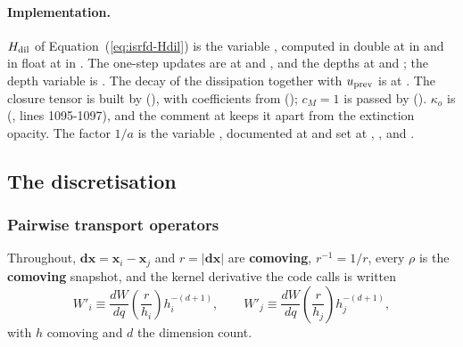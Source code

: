 \paragraph{Implementation.} $H_{\rm dil}$ of Equation~(\ref{eq:isrfd-Hdil}) is
the variable , computed in double at 
in  and in float at
 in . The
one-step updates are at  and ,
and the depths at  and ; the depth
variable is . The decay of the dissipation together with $u_{\rm prev}$
is at . The closure tensor is built by
(), with coefficients from
(); $c_M = 1$ is passed by
(). $\kappa_o$ is
(, lines 1095-1097), and the comment at
 keeps it apart from the extinction opacity. The
factor $1/a$ is the variable , documented
at  and set at ,
,  and .

\subsection{The discretisation}
\label{sec:isrf-eqdisc-disc}

\subsubsection{Pairwise transport operators}
\label{sec:isrf-eqdisc-pairwise}

Throughout, $\boldsymbol{dx} = \boldsymbol{x}_i - \boldsymbol{x}_j$ and
$r = |\boldsymbol{dx}|$ are \textbf{comoving}, $r^{-1} = 1/r$, every $\rho$ is the
\textbf{comoving}  snapshot, and the kernel derivative the code
calls  is written
\begin{equation}
  W'_i \equiv \frac{dW}{dq}\!\left(\frac{r}{h_i}\right) h_i^{-(d+1)},
  \qquad
  W'_j \equiv \frac{dW}{dq}\!\left(\frac{r}{h_j}\right) h_j^{-(d+1)},
  \label{eq:isrfd-kernel-deriv}
\end{equation}
with $h$ comoving and $d$ the dimension count.

